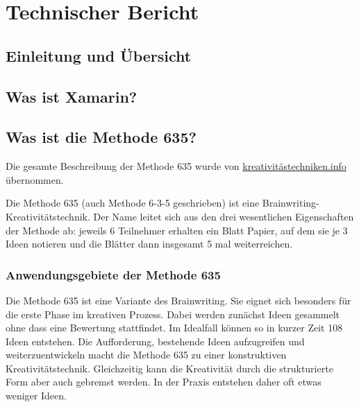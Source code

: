 \section{Technischer Bericht}

\subsection{Einleitung und Übersicht}

\subsection{Was ist Xamarin?}


\subsection{Was ist die Methode 635?} \label{subsec:methode_635_desc}
Die gesamte Beschreibung der Methode 635 wurde von \href{https://kreativitätstechniken.info/6-3-5-methode/}{kreativitästechniken.info} \cite{methode-635} übernommen. 


Die Methode 635 (auch Methode 6-3-5 geschrieben) ist eine Brainwriting-Kre\-ati\-vi\-täts\-technik. Der Name leitet sich aus den drei wesentlichen Eigenschaften der Methode ab: jeweils 6 Teilnehmer erhalten ein Blatt Papier, auf dem sie je 3 Ideen notieren und die Blätter dann insgesamt 5 mal weiterreichen.

\subsubsection*{Anwendungsgebiete der Methode 635}
Die Methode 635 ist eine Variante des Brainwriting. Sie eignet sich besonders für die erste Phase im kreativen Prozess. Dabei werden zunächst Ideen gesammelt ohne dass eine Bewertung stattfindet. Im Idealfall können so in kurzer Zeit 108 Ideen entstehen. Die Aufforderung, bestehende Ideen aufzugreifen und weiterzuentwickeln macht die Methode 635 zu einer konstruktiven Kreativitätstechnik. Gleichzeitig kann die Kreativität durch die strukturierte Form aber auch gebremst werden. In der Praxis entstehen daher oft etwas weniger Ideen.

